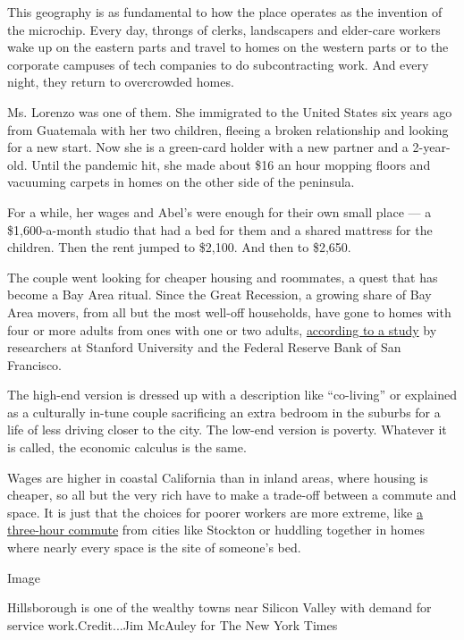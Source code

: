 This geography is as fundamental to how the place operates as the
invention of the microchip. Every day, throngs of clerks, landscapers
and elder-care workers wake up on the eastern parts and travel to homes
on the western parts or to the corporate campuses of tech companies to
do subcontracting work. And every night, they return to overcrowded
homes.

Ms. Lorenzo was one of them. She immigrated to the United States six
years ago from Guatemala with her two children, fleeing a broken
relationship and looking for a new start. Now she is a green-card holder
with a new partner and a 2-year-old. Until the pandemic hit, she made
about \$16 an hour mopping floors and vacuuming carpets in homes on the
other side of the peninsula.

For a while, her wages and Abel's were enough for their own small place
--- a \$1,600-a-month studio that had a bed for them and a shared
mattress for the children. Then the rent jumped to \$2,100. And then to
\$2,650.

The couple went looking for cheaper housing and roommates, a quest that
has become a Bay Area ritual. Since the Great Recession, a growing share
of Bay Area movers, from all but the most well-off households, have gone
to homes with four or more adults from ones with one or two adults,
\href{https://www.frbsf.org/community-development/blog/overcrowding-in-the-bay-area-where-the-housing-crisis-meets-covid-19/}{according
to a study} by researchers at Stanford University and the Federal
Reserve Bank of San Francisco.

The high-end version is dressed up with a description like ``co-living''
or explained as a culturally in-tune couple sacrificing an extra bedroom
in the suburbs for a life of less driving closer to the city. The
low-end version is poverty. Whatever it is called, the economic calculus
is the same.

Wages are higher in coastal California than in inland areas, where
housing is cheaper, so all but the very rich have to make a trade-off
between a commute and space. It is just that the choices for poorer
workers are more extreme, like
\href{https://www.nytimes.com/2017/08/17/business/economy/san-francisco-commute.html}{a
three-hour commute} from cities like Stockton or huddling together in
homes where nearly every space is the site of someone's bed.

Image

Hillsborough is one of the wealthy towns near Silicon Valley with demand
for service work.Credit...Jim McAuley for The New York Times

